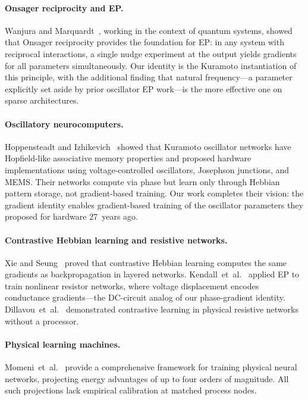 \documentclass[11pt,a4paper]{article}
\begin{document}
\paragraph{Onsager reciprocity and EP.}
Wanjura and Marquardt~\citeyearpar{wanjura2025quantum}, working in the
context of quantum systems, showed that Onsager reciprocity provides the
foundation for EP: in any system with reciprocal interactions, a single
nudge experiment at the output yields gradients for all parameters
simultaneously. Our identity is the Kuramoto instantiation
of this principle, with the additional finding that natural
frequency---a parameter explicitly set aside by prior oscillator
EP work---is the more effective one on sparse architectures.

\paragraph{Oscillatory neurocomputers.}
Hoppensteadt and Izhikevich~\citeyearpar{hoppensteadt1999oscillatory} showed
that Kuramoto oscillator networks have Hopfield-like associative memory
properties and proposed hardware implementations using voltage-controlled
oscillators, Josephson junctions, and MEMS. Their networks
compute via phase but learn only through Hebbian pattern storage, not
gradient-based training. Our work completes their vision: the gradient
identity enables gradient-based training of the oscillator parameters
they proposed for hardware 27~years ago.

\paragraph{Contrastive Hebbian learning and resistive networks.}
Xie and Seung~\citeyearpar{xie2003equivalence} proved that contrastive Hebbian
learning computes the same gradients as backpropagation in layered
networks. Kendall~et~al.~\citeyearpar{kendall2020training} applied EP to train
nonlinear resistor networks, where voltage displacement encodes
conductance gradients---the DC-circuit analog of our phase-gradient
identity. Dillavou~et~al.~\citeyearpar{dillavou2024machine} demonstrated
contrastive learning in physical resistive networks without a processor.

\paragraph{Physical learning machines.}
Momeni~et~al.~\citeyearpar{momeni2025training} provide a comprehensive framework
for training physical neural networks, projecting energy advantages of up
to four orders of magnitude. All such projections lack empirical
calibration at matched process nodes.
\end{document}
